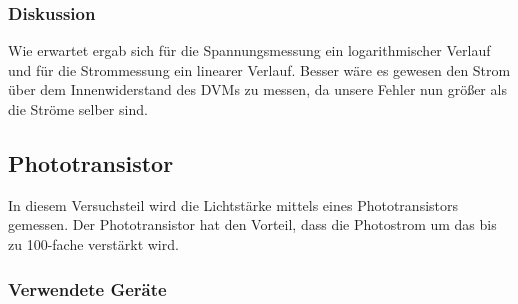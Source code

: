 \documentclass[12pt,a4paper]{article}
\begin{document}
\subsubsection*{Diskussion}

Wie erwartet ergab sich für die Spannungsmessung ein logarithmischer Verlauf und für die Strommessung ein linearer Verlauf.
Besser wäre es gewesen den Strom über dem Innenwiderstand des DVMs zu messen, da unsere Fehler nun größer als die Ströme selber sind.

\subsection{Phototransistor}

In diesem Versuchsteil wird die Lichtstärke mittels eines Phototransistors gemessen. Der Phototransistor hat den Vorteil, dass die Photostrom um das bis zu 100-fache verstärkt wird.

\subsubsection*{Verwendete Geräte}
\end{document}
